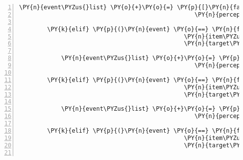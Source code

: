 \begin{Verbatim}[commandchars=\\\{\},numbers=left,firstnumber=1,stepnumber=1]
            \PY{n}{event\PYZus{}list} \PY{o}{+}\PY{o}{=} \PY{p}{[}\PY{n}{fabula}\PY{o}{.}\PY{n}{PerceptionEvent}\PY{p}{(}\PY{n}{identifier}\PY{o}{=}\PY{n}{ID\PYZus{}KUNI}\PY{p}{,}
                                                  \PY{n}{perception}\PY{o}{=}\PY{l+s}{\PYZsq{}}\PY{l+s}{Warum sollte ich der fiesen Spinne den Schlüssel zurückgeben?}\PY{l+s}{\PYZsq{}}\PY{p}{)}\PY{p}{]}

        \PY{k}{elif} \PY{p}{(}\PY{n}{event} \PY{o}{==} \PY{n}{fabula}\PY{o}{.}\PY{n}{TriesToDropEvent}\PY{p}{(}\PY{n}{identifier}\PY{o}{=}\PY{n}{ID\PYZus{}KUNI}\PY{p}{,}
                                               \PY{n}{item\PYZus{}identifier}\PY{o}{=}\PY{l+s}{\PYZsq{}}\PY{l+s}{key}\PY{l+s}{\PYZsq{}}\PY{p}{,}
                                               \PY{n}{target\PYZus{}identifier}\PY{o}{=}\PY{l+s}{\PYZsq{}}\PY{l+s}{sign}\PY{l+s}{\PYZsq{}}\PY{p}{)}\PY{p}{)}\PY{p}{:}

            \PY{n}{event\PYZus{}list} \PY{o}{+}\PY{o}{=} \PY{p}{[}\PY{n}{fabula}\PY{o}{.}\PY{n}{PerceptionEvent}\PY{p}{(}\PY{n}{identifier}\PY{o}{=}\PY{n}{ID\PYZus{}KUNI}\PY{p}{,}
                                                  \PY{n}{perception}\PY{o}{=}\PY{l+s}{\PYZsq{}}\PY{l+s}{Wo soll ich da den Schlüssel reinstecken?}\PY{l+s}{\PYZsq{}}\PY{p}{)}\PY{p}{]}

        \PY{k}{elif} \PY{p}{(}\PY{n}{event} \PY{o}{==} \PY{n}{fabula}\PY{o}{.}\PY{n}{TriesToDropEvent}\PY{p}{(}\PY{n}{identifier}\PY{o}{=}\PY{n}{ID\PYZus{}KUNI}\PY{p}{,}
                                               \PY{n}{item\PYZus{}identifier}\PY{o}{=}\PY{l+s}{\PYZsq{}}\PY{l+s}{key}\PY{l+s}{\PYZsq{}}\PY{p}{,}
                                               \PY{n}{target\PYZus{}identifier}\PY{o}{=}\PY{l+s}{\PYZsq{}}\PY{l+s}{cobweb}\PY{l+s}{\PYZsq{}}\PY{p}{)}\PY{p}{)}\PY{p}{:}

            \PY{n}{event\PYZus{}list} \PY{o}{+}\PY{o}{=} \PY{p}{[}\PY{n}{fabula}\PY{o}{.}\PY{n}{PerceptionEvent}\PY{p}{(}\PY{n}{identifier}\PY{o}{=}\PY{n}{ID\PYZus{}KUNI}\PY{p}{,}
                                                  \PY{n}{perception}\PY{o}{=}\PY{l+s}{\PYZsq{}}\PY{l+s}{Hm, das macht keinen Sinn.}\PY{l+s}{\PYZsq{}}\PY{p}{)}\PY{p}{]}

        \PY{k}{elif} \PY{p}{(}\PY{n}{event} \PY{o}{==} \PY{n}{fabula}\PY{o}{.}\PY{n}{TriesToDropEvent}\PY{p}{(}\PY{n}{identifier}\PY{o}{=}\PY{n}{ID\PYZus{}KUNI}\PY{p}{,}
                                               \PY{n}{item\PYZus{}identifier}\PY{o}{=}\PY{l+s}{\PYZsq{}}\PY{l+s}{key}\PY{l+s}{\PYZsq{}}\PY{p}{,}
                                               \PY{n}{target\PYZus{}identifier}\PY{o}{=}\PY{l+s}{\PYZsq{}}\PY{l+s}{bridge}\PY{l+s}{\PYZsq{}}\PY{p}{)}\PY{p}{)}\PY{p}{:}


\end{Verbatim}
